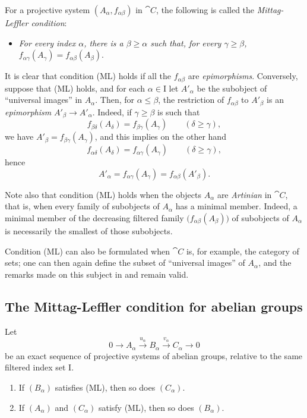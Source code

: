\begin{env}[13.1.2]
\label{0.13.1.2}
For a projective system $(A_\alpha,f_{\alpha\beta})$ in $\cat{C}$,
the following is called the \emph{Mittag-Leffler condition}:
\begin{itemize}
  \item[(ML)]
  \emph{For every index $\alpha$, there is a $\beta\geq\alpha$ such
  that, for every $\gamma\geq\beta$,} $f_{\alpha\gamma}(A_\gamma)
=
f_{\alpha\beta}(A_\beta)$.
\end{itemize}

It is clear that condition (ML) holds if all the
$f_{\alpha\beta}$ are \emph{epimorphisms}.
Conversely, suppose that (ML) holds, and for each
$\alpha\in\mathrm{I}$ let $A'_\alpha$ be the subobject of ``universal
images'' in $A_\alpha$.
Then, for $\alpha\leq\beta$, the restriction of
$f_{\alpha\beta}$ to $A'_\beta$ is an \emph{epimorphism} $A'_\beta\longrightarrow A'_\alpha$.
Indeed, if $\gamma\geq\beta$ is such that
\[
  f_{\beta\delta}(A_\delta)
  =
  f_{\beta\gamma}(A_\gamma)
  \qquad(\delta\geq\gamma),
\]
we have $A'_\beta=f_{\beta\gamma}(A_\gamma)$, and this implies on the other hand
\[
  f_{\alpha\delta}(A_\delta)
  =
  f_{\alpha\gamma}(A_\gamma)
  \qquad(\delta\geq\gamma),
\]
hence
\[
  A'_\alpha
  =
  f_{\alpha\gamma}(A_\gamma)
  =
  f_{\alpha\beta}(A'_\beta).
\]

Note also that condition (ML) holds when the objects $A_\alpha$ are
\emph{Artinian} in $\cat{C}$, that is, when every family of
subobjects of $A_\alpha$ has a minimal member.
Indeed, a minimal member of the decreasing filtered family
$\bigl(f_{\alpha\beta}(A_\beta)\bigr)$ of subobjects of $A_\alpha$
is necessarily the smallest of those subobjects.
\end{env}

\begin{remark}[13.1.3]
\label{0.13.1.3}
Condition (ML) can also be formulated when $\cat{C}$ is, for
example, the category of sets; one can then again define the
subset of ``universal images'' of $A_\alpha$,
and the remarks made on this subject in  and
 remain valid.
\end{remark}

\subsection{The Mittag-Leffler condition for abelian groups}
\label{subsection:0.13.2}

\begin{proposition}[13.2.1]
\label{0.13.2.1}
Let
\[
  0\longrightarrow A_\alpha
  \xrightarrow{u_\alpha}B_\alpha
  \xrightarrow{v_\alpha}C_\alpha
  \longrightarrow0
\]
be an exact sequence of projective systems of abelian groups, relative
to the same filtered index set $\mathrm{I}$.
\begin{enumerate}
  \item[{\rm(i)}]
  If $(B_\alpha)$ satisfies {\rm(ML)}, then so does $(C_\alpha)$.
  \item[{\rm(ii)}]
  If $(A_\alpha)$ and $(C_\alpha)$ satisfy {\rm(ML)}, then so does
  $(B_\alpha)$.
\end{enumerate}
\end{proposition}

